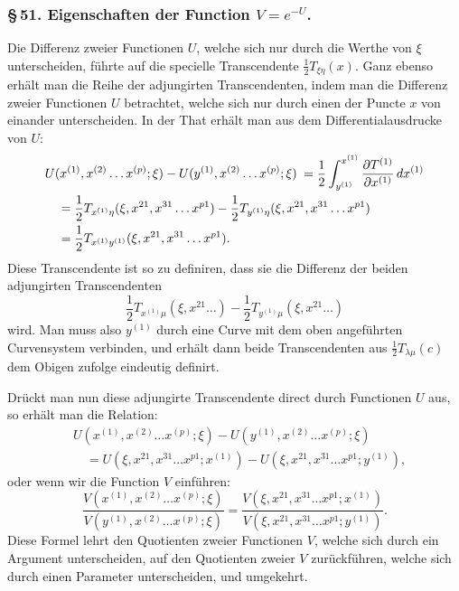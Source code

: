 \documentclass[10pt]{article}
\begin{document}
\subsubsection*{\S\,51. Eigenschaften der Function \(V=e^{-U}\).}

Die Differenz zweier Functionen \(U\), welche sich nur durch die Werthe von \(\xi\) unterscheiden, führte auf die specielle Transcendente \(\frac12T_{\xi\eta}(x)\). Ganz ebenso erhält man die Reihe der adjungirten Transcendenten, indem man die Differenz zweier Functionen \(U\) betrachtet, welche sich nur durch einen der Puncte \(x\) von einander unterscheiden. In der That erhält man aus dem Differentialausdrucke von \(U\):
\[
\begin{aligned}
&U(x^{(1)},x^{(2)}\ldots x^{(p)};\xi)-U(y^{(1)},x^{(2)}\ldots x^{(p)};\xi)\nobreak\hspace{0.25em}\nobreak=\frac12\int_{y^{(1)}}^{x^{(1)}}\frac{\partial T^{(1)}}{\partial x^{(1)}}\,dx^{(1)}\\
&\quad=\frac12T_{x^{(1)}\eta}(\xi,x^{21},x^{31}\ldots x^{p1})-\frac12T_{y^{(1)}\eta}(\xi,x^{21},x^{31}\ldots x^{p1})\\
&\quad=\frac12T_{x^{(1)}y^{(1)}}(\xi,x^{21},x^{31}\ldots x^{p1}).
\end{aligned}
\]
Diese Transcendente ist so zu definiren, dass sie die Differenz der beiden adjungirten Transcendenten
\[
\frac12T_{x^{(1)}\mu}(\xi,x^{21}\ldots)-\frac12T_{y^{(1)}\mu}(\xi,x^{21}\ldots)
\]
wird. Man muss also \(y^{(1)}\) durch eine Curve mit dem oben angeführten Curvensystem verbinden, und erhält dann beide Transcendenten aus \(\frac12T_{\lambda\mu}(c)\) dem Obigen zufolge eindeutig definirt.

Drückt man nun diese adjungirte Transcendente direct durch Functionen \(U\) aus, so erhält man die Relation:
\[
\tag{1}\begin{aligned}
&U(x^{(1)},x^{(2)}\ldots x^{(p)};\xi)-U(y^{(1)},x^{(2)}\ldots x^{(p)};\xi)\\
&\quad=U(\xi,x^{21},x^{31}\ldots x^{p1};x^{(1)})-U(\xi,x^{21},x^{31}\ldots x^{p1};y^{(1)}),
\end{aligned}
\]
oder wenn wir die Function \(V\) einführen:
\[
\tag{2}\frac{V(x^{(1)},x^{(2)}\ldots x^{(p)};\xi)}{V(y^{(1)},x^{(2)}\ldots x^{(p)};\xi)}
=\frac{V(\xi,x^{21},x^{31}\ldots x^{p1};x^{(1)})}{V(\xi,x^{21},x^{31}\ldots x^{p1};y^{(1)})}.
\]
Diese Formel lehrt den Quotienten zweier Functionen \(V\), welche sich durch ein Argument unterscheiden, auf den Quotienten zweier \(V\) zurückführen, welche sich durch einen Parameter unterscheiden, und umgekehrt.
\end{document}
